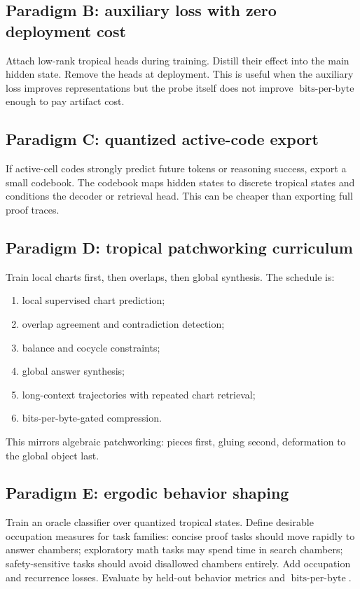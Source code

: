 \documentclass[11pt]{article}
\newcommand{\bpb}{\operatorname{bits\mbox{-}per\mbox{-}byte}}
\begin{document}
\subsection{Paradigm B: auxiliary loss with zero deployment cost}

Attach low-rank tropical heads during training.  Distill their effect into the main hidden state.  Remove the heads at deployment.  This is useful when the auxiliary loss improves representations but the probe itself does not improve \(\bpb\) enough to pay artifact cost.

\subsection{Paradigm C: quantized active-code export}

If active-cell codes strongly predict future tokens or reasoning success, export a small codebook.  The codebook maps hidden states to discrete tropical states and conditions the decoder or retrieval head.  This can be cheaper than exporting full proof traces.

\subsection{Paradigm D: tropical patchworking curriculum}

Train local charts first, then overlaps, then global synthesis.  The schedule is:
\begin{enumerate}
\item local supervised chart prediction;
\item overlap agreement and contradiction detection;
\item balance and cocycle constraints;
\item global answer synthesis;
\item long-context trajectories with repeated chart retrieval;
\item bits-per-byte-gated compression.
\end{enumerate}

This mirrors algebraic patchworking: pieces first, gluing second, deformation to the global object last.

\subsection{Paradigm E: ergodic behavior shaping}

Train an oracle classifier over quantized tropical states.  Define desirable occupation measures for task families: concise proof tasks should move rapidly to answer chambers; exploratory math tasks may spend time in search chambers; safety-sensitive tasks should avoid disallowed chambers entirely.  Add occupation and recurrence losses.  Evaluate by held-out behavior metrics and \(\bpb\).
\end{document}
